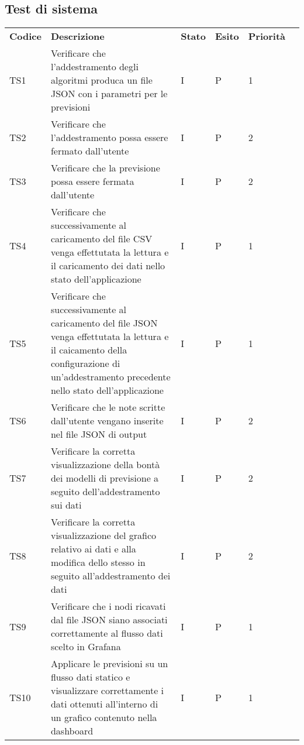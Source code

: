 
\subsection{Test di sistema}

\begin{longtable} {
	>{}p{12mm}
	>{}p{79.5mm}
	>{}p{9mm}
	>{}p{8mm}
	>{}p{14mm}
	>{}p{0mm}}
	\rowcolor{gray!50}
	\textbf{Codice} & \textbf{Descrizione} & \textbf{Stato} & \textbf{Esito} & \textbf{Priorità} & \TBstrut \\
	TS1 & Verificare che l'addestramento degli algoritmi produca un file JSON con i parametri per le previsioni & I & P & 1 & \TBstrut \\ [2mm]
	TS2 & Verificare che l'addestramento possa essere fermato dall'utente & I & P & 2 & \TBstrut \\ [2mm]
	TS3 & Verificare che la previsione possa essere fermata dall'utente & I & P & 2 & \TBstrut \\ [2mm]
	TS4 & Verificare che successivamente al caricamento del file CSV venga effettutata la lettura e il caricamento dei dati nello stato dell'applicazione & I & P & 1 & \TBstrut \\ [2mm]
	TS5 & Verificare che successivamente al caricamento del file JSON venga effettutata la lettura e il caicamento della configurazione di un'addestramento precedente nello stato dell'applicazione & I & P & 1 & \TBstrut \\ [2mm]
	TS6 & Verificare che le note scritte dall'utente vengano inserite nel file JSON di output & I & P & 2 & \TBstrut \\ [2mm]
	TS7 & Verificare la corretta visualizzazione della bontà dei modelli di previsione a seguito dell'addestramento sui dati & I & P & 2 & \TBstrut \\ [2mm]
	TS8 & Verificare la corretta visualizzazione del grafico relativo ai dati e alla modifica dello stesso in seguito all'addestramento dei dati & I & P & 2 & \TBstrut \\ [2mm]
	TS9 & Verificare che i nodi ricavati dal file JSON siano associati correttamente al flusso dati scelto in Grafana\glo & I & P & 1 & \TBstrut \\ [2mm]
	TS10 & Applicare le previsioni su un flusso dati statico e visualizzare correttamente i dati ottenuti all'interno di un grafico contenuto nella dashboard\glo & I & P & 1 & \TBstrut \\ [2mm]

\end{longtable}
